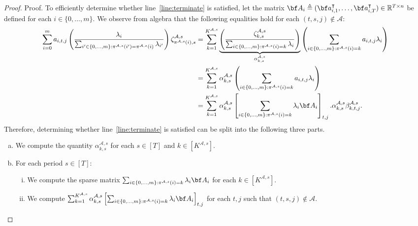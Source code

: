 \documentclass[nonblindrev,mnsc]{informs3} %
\newcommand{\ba}{{\bf a}}
\newcommand{\bba}{{\bf A}}
\def\Real{\mathbb{R}}
\let\R\Real
\begin{document}
\begin{APPENDICES}
\begin{proof}{Proof.}
To efficiently determine whether line~\eqref{line:terminate} is satisfied, let the matrix  $\bba_i \triangleq (\ba_{i,1}^\intercal,\ldots,\ba_{i,T}^\intercal) \in \R^{T \times n}$ be defined for each $i \in \{0,\ldots,m\}$. We observe from algebra that the following equalities hold for each $(t,s,j) \notin \mathcal{A}$:
\begin{align*}
     \sum_{i=0}^m   a_{i,t,j} \left( \frac{\lambda_i}{\sum_{i' \in \{0,\ldots,m\}: \pi^{\mathcal{A},s}(i') = \pi^{\mathcal{A},s}(i)} \lambda_{i'}} \right) \zeta^{\mathcal{A},s}_{\pi^{\mathcal{A},s}(i),s}  
              &= \sum_{k=1}^{K^{ \mathcal{A},s}} \underbrace{\left( \frac{ \zeta^{\mathcal{A},s}_{k,s}}{\sum_{i \in \{0,\ldots,m\}: \pi^{\mathcal{A},s}(i) =k} \lambda_{i}}\right)}_{\alpha_{k,s}^{\mathcal{A},s}} \left(  \sum_{i \in \{0,\ldots,m\}: \pi^{\mathcal{A},s}(i) = k}   a_{i,t,j} \lambda_i \right)  \\
                  &= \sum_{k=1}^{K^{ \mathcal{A},s}} \alpha_{k,s}^{\mathcal{A},s} \left(  \sum_{i \in \{0,\ldots,m\}: \pi^{\mathcal{A},s}(i) = k}   a_{i,t,j} \lambda_i \right)  \\
                    &= \sum_{k=1}^{K^{ \mathcal{A},s}} \alpha_{k,s}^{\mathcal{A},s}\left[\sum_{i \in \{0,\ldots,m\}: \pi^{\mathcal{A},s}(i) = k}  \lambda_i \bba_{i} \right]_{t,j}.
 \alpha^{\mathcal{A},s}_{k,s} \beta^{\mathcal{A},s}_{k,t,j}. 
\end{align*}
Therefore, determining whether line~\eqref{line:terminate} is satisfied can be split into the following three parts.
\begin{enumerate}[(a)]
\item We compute the quantity $\alpha_{k,s}^{\mathcal{A},s}$ for each $s \in [T]$ and $k \in [K^{\mathcal{A},s}]$.
\item For each period $s \in [T]$:
\begin{enumerate}[(i)]
\item We compute the sparse matrix $\sum_{i \in \{0,\ldots,m\}: \pi^{\mathcal{A},s}(i) = k}  \lambda_i \bba_{i}$  for each $k \in [K^{\mathcal{A},s}]$. 
\item We compute $\sum_{k=1}^{K^{ \mathcal{A},s}} \alpha_{k,s}^{\mathcal{A},s}\left[\sum_{i \in \{0,\ldots,m\}: \pi^{\mathcal{A},s}(i) = k}  \lambda_i \bba_{i} \right]_{t,j}$ for each $t,j$ such that $(t,s,j) \notin \mathcal{A}$. 
\end{enumerate}
\end{enumerate}

\end{proof}
\end{APPENDICES}
\end{document}
